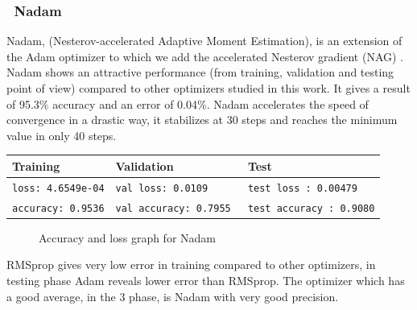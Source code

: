 \documentclass[lnbip]{svmultln}
\newcommand{\myfloatalign}{\centering}
\begin{document}
	
	
	\subsubsection*{\qquad \textbullet \ \textbf{Nadam}}
	Nadam, (Nesterov-accelerated Adaptive Moment Estimation), is an extension of the Adam optimizer to which we add the accelerated Nesterov gradient (NAG) \cite{ruder2016overview}.
	Nadam shows an attractive performance (from training, validation and testing point of view) compared to other optimizers studied in this work. It gives a result of 95.3\% accuracy and an error of 0.04\%. Nadam accelerates the speed of convergence in a drastic way, it stabilizes at 30 steps and reaches the minimum value in only 40 steps.
	
	\begin{table}[H]
		\centering
		\begin{tabular}{l|l|l}
			\hline
			\textbf{Training} & \textbf{Validation} & \textbf{Test} \\
			\hline
			\texttt{loss: 4.6549e-04} & \texttt{val loss: 0.0109} & \texttt{test loss : 0.00479} \\
			\texttt{accuracy: 0.9536} & \texttt{val accuracy: 0.7955 }& \texttt{test accuracy : 0.9080}\\
			
			\hline 
			
		\end{tabular}
	\end{table}
	
	\begin{figure}[H]
		\myfloatalign
		 \quad
		
		\caption[]{Accuracy and loss graph for Nadam}
	\end{figure}
	RMSprop gives very low error in training compared to other optimizers, in testing phase Adam reveals lower error than RMSprop. The optimizer which has a good average, in the 3 phase, is Nadam with very good precision.
	
\end{document}
